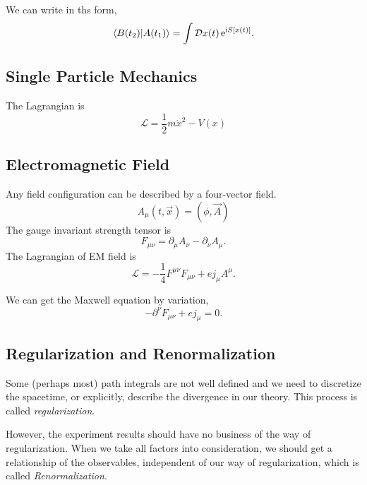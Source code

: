 We can write in ths form,
\begin{equation}
  \bra{B(t_2)}\ket{A(t_1)} = \int \mathcal{D} x (t) \, \mathrm{e}^{\mathrm{i} S[x(t)]}.
\end{equation}

\subsection[单粒子力学]{Single Particle Mechanics}
The Lagrangian is 
\begin{equation}
  \mathcal{L} = \frac{1}{2} m \dot{x}^2 - V(x)
\end{equation}

\subsection[电磁场]{Electromagnetic Field}
Any field configuration can be described by a four-vector field.
\begin{equation}
  A_{\mu}(t,\vec{x}) = (\phi,\vec{A})
\end{equation}
The gauge invariant strength tensor is
\begin{equation}
  F_{\mu\nu} = \partial_{\mu}A_{\nu} - \partial_{\nu} A_{\mu}.
\end{equation}
The Lagrangian of EM field is
\begin{equation}
  \mathcal{L}  = -\frac{1}{4} F^{\mu\nu} F_{\mu\nu} + e j_{\mu} A^{\mu}.
\end{equation}

We can get the Maxwell equation by variation,
\begin{equation}
  -\partial ^{\nu} F_{\mu\nu} + ej _{\mu} = 0.
\end{equation}

\subsection[正规化和重整化]{Regularization and Renormalization}
Some (perhaps most) path integrals are not well defined and we need to discretize the spacetime, or explicitly, describe the divergence in our theory. This process is called \textit{regularization}.

However, the experiment results should have no business of the way of regularization. When we take all factors into consideration, we should get a relationship of the observables, independent of our way of regularization, which is called \textit{Renormalization}.

